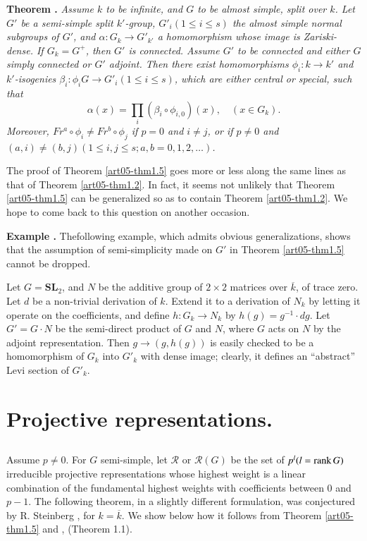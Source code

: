 \medskip
\noindent
{\bf Theorem .\label{art05-thm1.5}}
{\em Assume $k$ to be infinite, and $G$ to be almost simple, split over $k$. Let $G'$ be a semi-simple split $k'$-group, $G'_{i}(1\leq i\leq s)$ the almost simple normal subgroups of $G'$, and $\alpha : G_{k}\to G'_{k'}$ a homomorphism whose image is Zariski-dense. If $G_{k}=G^{+}$, then $G'$ is connected. Assume $G'$ to be connected and either $G$ simply connected or $G'$ adjoint. Then there exist homomorphisms $\phi_{i}:k\to k'$ and $k'$-isogenies $\beta_{i}:\phi_{i}G\to G'_{i}(1\leq i\leq s)$, which are either central or special, such that}
$$
\alpha(x)=\prod\limits_{i}(\beta_{i}\circ \phi_{i,0})(x),\quad (x\in G_{k}).
$$
{\em Moreover, $Fr^{a}\circ \phi_{i}\neq Fr^{b}\circ \phi_{j}$ if $p=0$ and $i\neq j$, or if $p\neq 0$ and $(a,i)\neq (b,j)(1\leq i, j\leq s;a,b=0,1,2,\ldots)$.}
\smallskip

The proof of Theorem \ref{art05-thm1.5} goes more or less along the same lines as that of Theorem \ref{art05-thm1.2}. In fact, it seems not unlikely that Theorem \ref{art05-thm1.5} can be generalized so as to contain Theorem \ref{art05-thm1.2}. We hope to come back to this question on another occasion.

\medskip
\noindent
{\bf Example .\label{art05-exam1.6}}
The\pageoriginale following example, which admits obvious generalizations, shows that the assumption of semi-simplicity made on $G'$ in Theorem \ref{art05-thm1.5} cannot be dropped.
\smallskip

Let $G=\mathbf{SL}_{2}$, and $N$ be the additive group of $2\times 2$ matrices over $\overline{k}$, of trace zero. Let $d$ be a non-trivial derivation of $k$. Extend it to a derivation of $N_{k}$ by letting it operate on the coefficients, and define $h:G_{k}\to N_{k}$ by $h(g)=g^{-1}\cdot dg$. Let $G'=G\cdot N$ be the semi-direct product of $G$ and $N$, where $G$ acts on $N$ by the adjoint representation. Then $g\to (g,h(g))$ is easily checked to be a homomorphism of $G_{k}$ into $G'_{k}$ with dense image; clearly, it defines an ``abstract'' Levi section of $G'_{k}$.

\section{Projective representations.}\label{art05-sec2}

\subsection{}\label{art05-sec2.1}
Assume $p\neq 0$. For $G$ semi-simple, let $\mathscr{R}$ or $\mathscr{R}(G)$ be the set of $p^{l}(l=\operatorname{\mathrm{rank}} G)$ irreducible projective representations whose highest weight is a linear combination of the fundamental highest weights with coefficients between 0 and $p-1$. The following theorem, in a slightly different formulation, was conjectured by R. Steinberg \cite{art05-key9}, for $k=\overline{k}$. We show below how it follows from Theorem \ref{art05-thm1.5} and \cite{art05-key9}, (Theorem 1.1).

